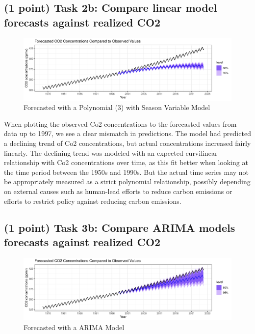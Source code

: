 \documentclass[
]{article}
\begin{document}
\subsection{(1 point) Task 2b: Compare linear model forecasts against realized CO2}\label{point-task-2b-compare-linear-model-forecasts-against-realized-co2}

\begin{figure}

{\centering \includegraphics[width=1\linewidth]{lab_prompt_Updated_files/figure-latex/comparing-to-forecast-1} 

}

\caption{Forecasted with a Polynomial (3) with Season Variable Model}\label{fig:comparing-to-forecast}
\end{figure}

When plotting the observed Co2 concentrations to the forecasted values from data up to 1997, we see a clear mismatch in predictions. The model had predicted a declining trend of Co2 concentrations, but actual concentrations increased fairly linearly. The declining trend was modeled with an expected curvilinear relationship with Co2 concentrations over time, as this fit better when looking at the time period between the 1950s and 1990s. But the actual time series may not be appropriately measured as a strict polynomial relationship, possibly depending on external causes such as human-lead efforts to reduce carbon emissions or efforts to restrict policy against reducing carbon emissions.

\subsection{(1 point) Task 3b: Compare ARIMA models forecasts against realized CO2}\label{point-task-3b-compare-arima-models-forecasts-against-realized-co2}

\begin{figure}

{\centering \includegraphics[width=1\linewidth]{lab_prompt_Updated_files/figure-latex/comparing-to-arima-1} 

}

\caption{Forecasted with a ARIMA Model}\label{fig:comparing-to-arima}
\end{figure}
\end{document}
